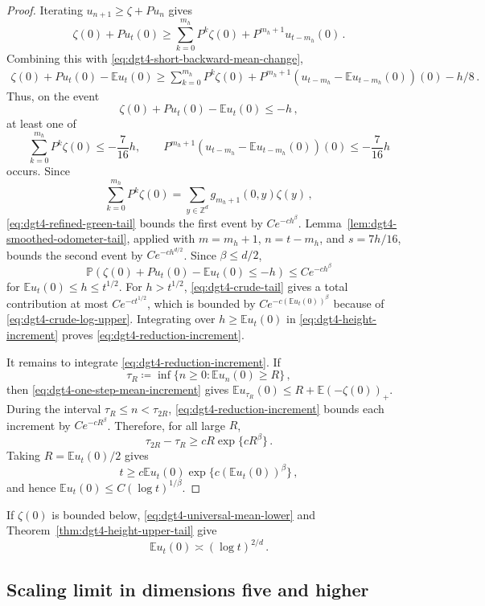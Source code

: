 \documentclass[11pt]{amsart}
\theoremstyle{plain}
\theoremstyle{definition}
\newcommand{\Z}{\mathbb{Z}}
\newcommand{\E}{\mathbb{E}}
\renewcommand{\P}{\mathbb{P}}
\begin{document}
\begin{proof}
			Iterating $u_{n+1}\geq\zeta+Pu_n$ gives
			\[
				\zeta(0)+Pu_t(0)
				\geq
				\sum_{k=0}^{m_h}P^k\zeta(0)
				+
				P^{m_h+1}u_{t-m_h}(0)\, .
			\]
			Combining this with \eqref{eq:dgt4-short-backward-mean-change},
			\[
			\begin{aligned}
				\zeta(0)+Pu_t(0)-\E u_t(0)
				\geq
				\sum_{k=0}^{m_h}P^k\zeta(0)
				+
				P^{m_h+1}\left(u_{t-m_h}-\E u_{t-m_h}(0)\right)(0)
				-h/8\, .
			\end{aligned}
			\]
			Thus, on the event
			\[
				\zeta(0)+Pu_t(0)-\E u_t(0)\leq-h\, ,
			\]
			at least one of
			\[
				\sum_{k=0}^{m_h}P^k\zeta(0)
				\leq-\frac7{16}h,
				\qquad
				P^{m_h+1}
				\left(u_{t-m_h}
				-\E u_{t-m_h}(0)\right)(0)
				\leq-\frac7{16}h
			\]
			occurs. Since
			\[
				\sum_{k=0}^{m_h}P^k\zeta(0)
				=
				\sum_{y\in\Z^d}g_{m_h+1}(0,y)\zeta(y)\, ,
			\]
			\eqref{eq:dgt4-refined-green-tail} bounds the first event by
			$Ce^{-ch^\beta}$. Lemma~\ref{lem:dgt4-smoothed-odometer-tail},
			applied with $m=m_h+1$, $n=t-m_h$, and $s=7h/16$, bounds the
			second event by $Ce^{-ch^{d/2}}$. Since $\beta\leq d/2$,
			\[
				\P\left(\zeta(0)+Pu_t(0)-\E u_t(0)\leq-h\right)
				\leq
				Ce^{-ch^\beta}
			\]
			for $\E u_t(0)\leq h\leq t^{1/2}$. For $h>t^{1/2}$, \eqref{eq:dgt4-crude-tail} gives a total contribution at most $Ce^{-ct^{1/2}}$,
			which is bounded by $Ce^{-c(\E u_t(0))^\beta}$ because of
			\eqref{eq:dgt4-crude-log-upper}. Integrating over
			$h\geq\E u_t(0)$ in \eqref{eq:dgt4-height-increment} proves
			\eqref{eq:dgt4-reduction-increment}.

			It remains to integrate \eqref{eq:dgt4-reduction-increment}. If
			\[
				\tau_R\coloneqq\inf\{n\geq0:\E u_n(0)\geq R\}\, ,
			\]
			then \eqref{eq:dgt4-one-step-mean-increment} gives
			$\E u_{\tau_R}(0)\leq R+\E(-\zeta(0))_+$. During the interval
			$\tau_R\leq n<\tau_{2R}$, \eqref{eq:dgt4-reduction-increment} bounds
			each increment by $Ce^{-cR^\beta}$. Therefore, for all large $R$,
			\[
				\tau_{2R}-\tau_R\geq cR\exp\{cR^\beta\}\, .
			\]
			Taking
			$R=\E u_t(0)/2$ gives
			\[
				t\geq c\E u_t(0)\exp\{c(\E u_t(0))^\beta\}\, ,
			\]
			and hence $\E u_t(0)\leq C(\log t)^{1/\beta}$.
		\end{proof}

If $\zeta(0)$ is bounded below, \eqref{eq:dgt4-universal-mean-lower}
and Theorem~\ref{thm:dgt4-height-upper-tail} give
\[
	\E u_t(0)\asymp(\log t)^{2/d}\, .
\]

\subsection{Scaling limit in dimensions five and higher}\label{ssec:dgt4-diffusive-membrane}
\end{document}
